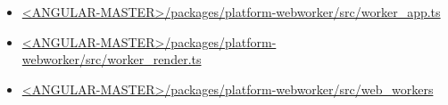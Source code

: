 \begin{itemize}
  \item \href{https://github.com/angular/angular/blob/master/packages/platform-webworker/src/worker_app.ts}
        {<ANGULAR-MASTER>/packages/platform-webworker/src/worker\_app.ts}
\end{itemize}






\begin{itemize}
  \item \href{https://github.com/angular/angular/blob/master/packages/platform-webworker/src/worker_render.ts}
        {<ANGULAR-MASTER>/packages/platform-webworker/src/worker\_render.ts}
\end{itemize}






\begin{itemize}
  \item \href{https://github.com/angular/angular/tree/master/packages/platform-webworker/src/web_workers}
        {<ANGULAR-MASTER>/packages/platform-webworker/src/web\_workers}
\end{itemize}






